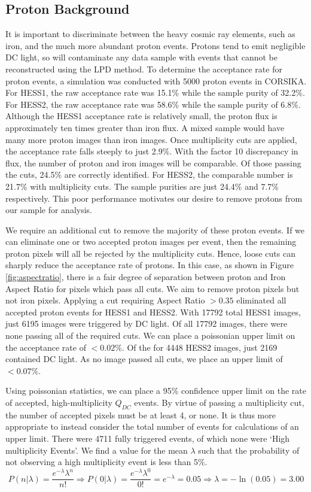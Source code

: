 \documentclass[11pt]{article}
\begin{document}
\subsection{Proton Background}
It is important to discriminate between the heavy cosmic ray elements, such as iron, and the much more abundant proton events. Protons tend to emit negligible DC light, so will contaminate any data sample with events that cannot be reconstructed using the LPD method. To determine the acceptance rate for proton events, a simulation was conducted with 5000 proton events in CORSIKA. For HESS1, the raw acceptance rate was 15.1\% while the sample purity of 32.2\%. For HESS2, the raw acceptance rate was 58.6\% while the sample purity of 6.8\%. Although the HESS1 acceptance rate is relatively small, the proton flux is approximately ten times greater than iron flux. A mixed sample would have many more proton images than iron images. Once multiplicity cuts are applied, the acceptance rate falls steeply to just 2.9\%. With the factor 10 discrepancy in flux, the number of proton and iron images will be comparable. Of those passing the cuts, 24.5\% are correctly identified.  For HESS2, the comparable number is 21.7\% with multiplicity cuts. The sample purities are just 24.4\% and 7.7\% respectively. This poor performance motivates our desire to remove protons from our sample for analysis.

We require an additional cut to remove the majority of these proton events. If we can eliminate one or two accepted proton images per event, then the remaining proton pixels will all be rejected by the multiplicity cuts. Hence, loose cuts can sharply reduce the acceptance rate of protons. In this case, as shown in Figure \ref{fig:aspectratio}, there is a fair degree of separation between proton and Iron Aspect Ratio for pixels which pass all cuts. We aim to remove proton pixels but not iron pixels. Applying a cut requiring Aspect Ratio $> 0.35$ eliminated all accepted proton events for HESS1 and HESS2. With 17792 total HESS1 images, just 6195 images were triggered by DC light. Of all 17792 images, there were none passing all of the required cuts. We can place a poissonian upper limit on the acceptance rate of $< 0.02 \%$. Of the for 4448 HESS2 images, just 2169 contained DC light. As no image passed all cuts, we place an upper limit of $< 0.07\%$. 

Using poissonian statistics, we can place a 95\% confidence upper limit on the rate of accepted, high-multiplicity $Q_{DC}$ events. By virtue of passing a multiplicity cut, the number of accepted pixels must be at least 4, or none. It is thus more appropriate to instead consider the total number of events for calculations of an upper limit. There were 4711 fully triggered events, of which none were \textquoteleft High multiplicity Events'. We find a value for the mean $\lambda$ such that the probability of not observing a high multiplicity event is less than 5\%.
\[ P(n|\lambda)=\frac{e^{-\lambda}\lambda^{n}}{n!} \Longrightarrow P(0|\lambda)=\frac{e^{-\lambda}\lambda^{0}}{0!}=e^{-\lambda}=0.05
\Longrightarrow
\lambda = -\ln(0.05)=3.00\]
\end{document}
